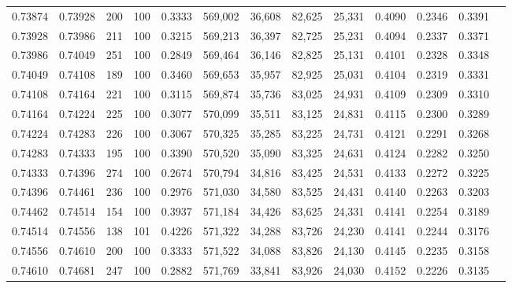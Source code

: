 \begin{tabular}{rrrrrrrrrrrrr}
0.73874 & 0.73928 &   200 & 100 &                                     0.3333 & 569,002 &  36,608 &  82,625 &  25,331 & 0.4090 & 0.2346 & 0.3391 \\
0.73928 & 0.73986 &   211 & 100 &                                     0.3215 & 569,213 &  36,397 &  82,725 &  25,231 & 0.4094 & 0.2337 & 0.3371 \\
0.73986 & 0.74049 &   251 & 100 &                                     0.2849 & 569,464 &  36,146 &  82,825 &  25,131 & 0.4101 & 0.2328 & 0.3348 \\
0.74049 & 0.74108 &   189 & 100 &                                     0.3460 & 569,653 &  35,957 &  82,925 &  25,031 & 0.4104 & 0.2319 & 0.3331 \\
0.74108 & 0.74164 &   221 & 100 &                                     0.3115 & 569,874 &  35,736 &  83,025 &  24,931 & 0.4109 & 0.2309 & 0.3310 \\
0.74164 & 0.74224 &   225 & 100 &                                     0.3077 & 570,099 &  35,511 &  83,125 &  24,831 & 0.4115 & 0.2300 & 0.3289 \\
0.74224 & 0.74283 &   226 & 100 &                                     0.3067 & 570,325 &  35,285 &  83,225 &  24,731 & 0.4121 & 0.2291 & 0.3268 \\
0.74283 & 0.74333 &   195 & 100 &                                     0.3390 & 570,520 &  35,090 &  83,325 &  24,631 & 0.4124 & 0.2282 & 0.3250 \\
0.74333 & 0.74396 &   274 & 100 &                                     0.2674 & 570,794 &  34,816 &  83,425 &  24,531 & 0.4133 & 0.2272 & 0.3225 \\
0.74396 & 0.74461 &   236 & 100 &                                     0.2976 & 571,030 &  34,580 &  83,525 &  24,431 & 0.4140 & 0.2263 & 0.3203 \\
0.74462 & 0.74514 &   154 & 100 &                                     0.3937 & 571,184 &  34,426 &  83,625 &  24,331 & 0.4141 & 0.2254 & 0.3189 \\
0.74514 & 0.74556 &   138 & 101 &                                     0.4226 & 571,322 &  34,288 &  83,726 &  24,230 & 0.4141 & 0.2244 & 0.3176 \\
0.74556 & 0.74610 &   200 & 100 &                                     0.3333 & 571,522 &  34,088 &  83,826 &  24,130 & 0.4145 & 0.2235 & 0.3158 \\
0.74610 & 0.74681 &   247 & 100 &                                     0.2882 & 571,769 &  33,841 &  83,926 &  24,030 & 0.4152 & 0.2226 & 0.3135 \\

\end{tabular}
